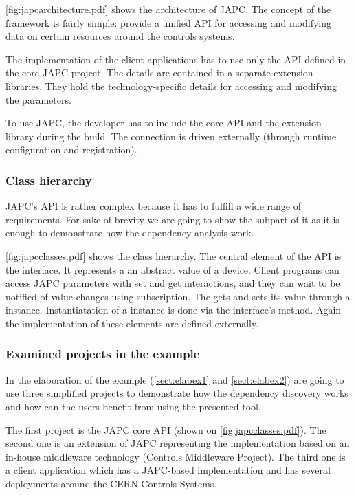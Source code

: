 \autoref{fig:japcarchitecture.pdf} shows the architecture of JAPC. The concept
of the framework is fairly simple: provide a unified API for accessing and
modifying data on certain resources around the controls systems. 

The implementation of the client applications has to use only the API defined
in the core JAPC project. The details are contained in a separate extension
libraries. They hold the  technology-specific details for accessing and
modifying the parameters. 

To use JAPC, the developer has to include the core API and the extension
library during the build. The connection is driven externally (through runtime
configuration and registration).


 \subsubsection{Class hierarchy}
JAPC's API is rather complex because it has to fulfill a wide range of
requirements. For sake of brevity we are going to show the subpart of it
as it is enough to demonstrate how the dependency analysis work.



\autoref{fig:japcclasses.pdf} shows the class hierarchy.
The central element of the API is the  interface.
It  represents a an abstract value of a device.
Client programs can access JAPC parameters with set and get interactions, and
they can wait to be notified of value changes using subscription.
The  gets and sets its value through a  instance.
Instantiatation of a  instance is done via the
 interface's  method. Again the
implementation of these elements are defined externally.

\subsubsection{Examined projects in the example}
In the elaboration of the example (\autoref{sect:elabex1} and
\autoref{sect:elabex2}) are going to use three simplified projects to
demonstrate how the dependency discovery works and how can the users benefit
from using the presented tool.

The first project is the JAPC core API (shown on \autoref{fig:japcclasses.pdf}).
The second one is an extension of JAPC representing the implementation based on 
an in-house middleware technology (Controls Middleware Project\cite{Cmw}). The
third one is a client application which has a JAPC-based implementation and has several
deployments around the CERN Controls Systems.


